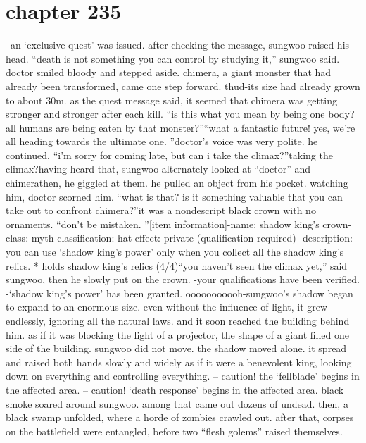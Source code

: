 \section{chapter 235}






 an ‘exclusive quest’ was issued.
 after checking the message, sungwoo raised his head.
“death is not something you can control by studying it,” sungwoo said.
doctor smiled bloody and stepped aside.
chimera, a giant monster that had already been transformed, came one step forward.
thud-its size had already grown to about 30m.
 as the quest message said, it seemed that chimera was getting stronger and stronger after each kill.
“is this what you mean by being one body? all humans are being eaten by that monster?”“what a fantastic future! yes, we’re all heading towards the ultimate one.
”doctor’s voice was very polite.
he continued, “i’m sorry for coming late, but can i take the climax?”taking the climax?having heard that, sungwoo alternately looked at “doctor” and chimerathen, he giggled at them.
 he pulled an object from his pocket.
watching him, doctor scorned him.
“what is that? is it something valuable that you can take out to confront chimera?”it was a nondescript black crown with no ornaments.
“don’t be mistaken.
”[item information]-name: shadow king’s crown-class: myth-classification: hat-effect: private (qualification required)
-description: you can use ‘shadow king’s power’ only when you collect all the shadow king’s relics.
* holds shadow king’s relics (4/4)“you haven’t seen the climax yet,” said sungwoo, then he slowly put on the crown.
-your qualifications have been verified.
-‘shadow king’s power’ has been granted.
ooooooooooh-sungwoo’s shadow began to expand to an enormous size.
even without the influence of light, it grew endlessly, ignoring all the natural laws.
 and it soon reached the building behind him.
 as if it was blocking the light of a projector, the shape of a giant filled one side of the building.
sungwoo did not move.
 the shadow moved alone.
 it spread and raised both hands slowly and widely as if it were a benevolent king, looking down on everything and controlling everything.
– caution! the ‘fellblade’ begins in the affected area.
– caution! ‘death response’ begins in the affected area.
black smoke soared around sungwoo.
 among that came out dozens of undead.
 then, a black swamp unfolded, where a horde of zombies crawled out.
 after that, corpses on the battlefield were entangled, before two “flesh golems” raised themselves.
